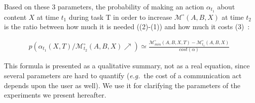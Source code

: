 \documentclass[natbib]{svjour3}
\newcommand{\eg}{{\textit{e.g.\ }}}
\newcommand{\Model}[3]{{$\mathcal{M}^{\circ}(#1, #2, #3)$}}
\begin{document}
Based on these 3 parameters, the probability of making an action $\alpha_{t_1}$
about content $X$ at time $t_1$ during task T in order to increase
\Model{A}{B}{X} at time $t_2$ is the ratio between how much it is needed
((2)-(1)) and how much it costs (3)~\citep{traum1996miscommunication}:

\begin{multline} \label{eq:probrepair}
    p(\alpha_{t_1}(X,T) / \mathcal{M}^{\circ}_{t_2}(A,B,X) \nearrow) \simeq
    \frac{\mathcal{M}^{\circ}_{min}(A,B,X,T) - \mathcal{M}^{\circ}_{t_1}(A,B,X)}{cost (\alpha)}
\end{multline}

This formula is presented as a qualitative summary, not as a real equation,
since several parameters are hard to quantify (\eg the cost of a communication
act depends upon the user as well). We use it for clarifying the parameters of
the experiments we present hereafter.
\end{document}
